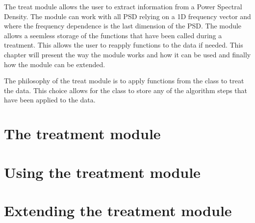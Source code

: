 The treat module allows the user to extract information from a Power Spectral Density. The module can work with all PSD relying on a 1D frequency vector and where the frequency dependence is the last dimension of the PSD. The module allows a seemless storage of the functions that have been called during a treatment. This allows the user to reapply functions to the data if needed. This chapter will present the way the module works and how it can be used and finally how the module can be extended.

The philosophy of the treat module is to apply functions from the class to treat the data. This choice allows for the class to store any of the algorithm steps that have been applied to the data. 

\section{The treatment module}
    

\section{Using the treatment module}
    

\section{Extending the treatment module}
    
